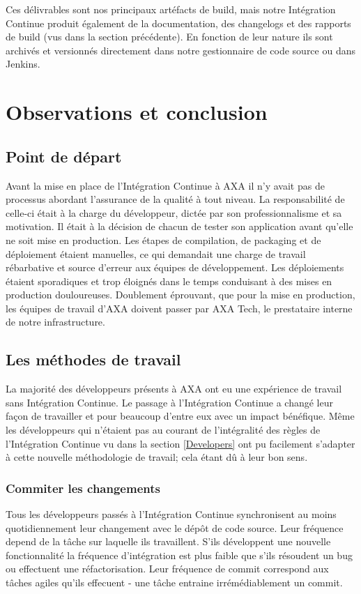   Ces délivrables sont nos principaux artéfacts de build, mais notre Intégration Continue produit également de la documentation, des changelogs et des rapports de build (vus dans la section précédente). En fonction de leur nature ils sont archivés et versionnés directement dans notre gestionnaire de code source ou dans Jenkins.\\

  \section{Observations et conclusion}
    \subsection{Point de départ}
    Avant la mise en place de l'Intégration Continue à AXA il n'y avait pas de processus abordant l'assurance de la qualité à tout niveau. La responsabilité de celle-ci était à la charge du développeur, dictée par son professionnalisme et sa motivation. Il était à la décision de chacun de tester son application avant qu'elle ne soit mise en production. Les étapes de compilation, de packaging et de déploiement étaient manuelles, ce qui demandait une charge de travail rébarbative et source d'erreur aux équipes de développement. Les déploiements étaient sporadiques et trop éloignés dans le temps conduisant à des mises en production douloureuses. Doublement éprouvant, que pour la mise en production, les équipes de travail d'AXA doivent passer par AXA Tech, le prestataire interne de notre infrastructure.\\

    \subsection{Les méthodes de travail}
    La majorité des développeurs présents à AXA ont eu une expérience de travail sans Intégration Continue. Le passage à l'Intégration Continue a changé leur façon de travailler et pour beaucoup d'entre eux avec un impact bénéfique. Même les développeurs qui n'étaient pas au courant de l'intégralité des règles de l'Intégration Continue vu dans la section \ref{Developers} ont pu facilement s'adapter à cette nouvelle méthodologie de travail; cela étant dû à leur bon sens.

      \subsubsection{Commiter les changements}
      Tous les développeurs passés à l'Intégration Continue synchronisent au moins quotidiennement leur changement avec le dépôt de code source. Leur fréquence depend de la tâche sur laquelle ils travaillent. S'ils développent une nouvelle fonctionnalité la fréquence d'intégration est plus faible que s'ils résoudent un bug ou effectuent une réfactorisation. Leur fréquence de commit correspond aux tâches agiles qu'ils effecuent - une tâche entraine irrémédiablement un commit.

